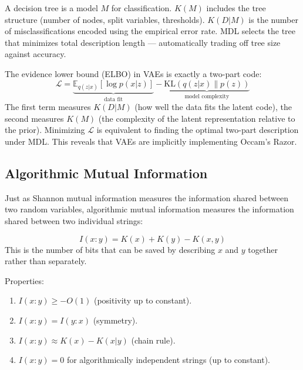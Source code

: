 \begin{example}
A decision tree is a model $M$ for classification. $K(M)$ includes the tree structure (number of nodes, split variables, thresholds). $K(D|M)$ is the number of misclassifications encoded using the empirical error rate. MDL selects the tree that minimizes total description length --- automatically trading off tree size against accuracy.
\end{example}

\begin{example}
The evidence lower bound (ELBO) in VAEs is exactly a two-part code:
\[
\mathcal{L} = \underbrace{\mathbb{E}_{q(z|x)}[\log p(x|z)]}_{\text{data fit}} - \underbrace{\text{KL}(q(z|x) \| p(z))}_{\text{model complexity}}
\]
The first term measures $K(D|M)$ (how well the data fits the latent code), the second measures $K(M)$ (the complexity of the latent representation relative to the prior). Minimizing $\mathcal{L}$ is equivalent to finding the optimal two-part description under MDL. This reveals that VAEs are implicitly implementing Occam's Razor.
\end{example}

\subsection{Algorithmic Mutual Information}
\label{sec:kolmogorov:mutual}

Just as Shannon mutual information measures the information shared between two random variables, algorithmic mutual information measures the information shared between two individual strings:

\begin{definition}
\[
I(x:y) = K(x) + K(y) - K(x,y)
\]
This is the number of bits that can be saved by describing $x$ and $y$ together rather than separately.
\end{definition}

Properties:
\begin{enumerate}
\item $I(x:y) \ge -O(1)$ (positivity up to constant).
\item $I(x:y) = I(y:x)$ (symmetry).
\item $I(x:y) \approx K(x) - K(x|y)$ (chain rule).
\item $I(x:y) = 0$ for algorithmically independent strings (up to constant).
\end{enumerate}

